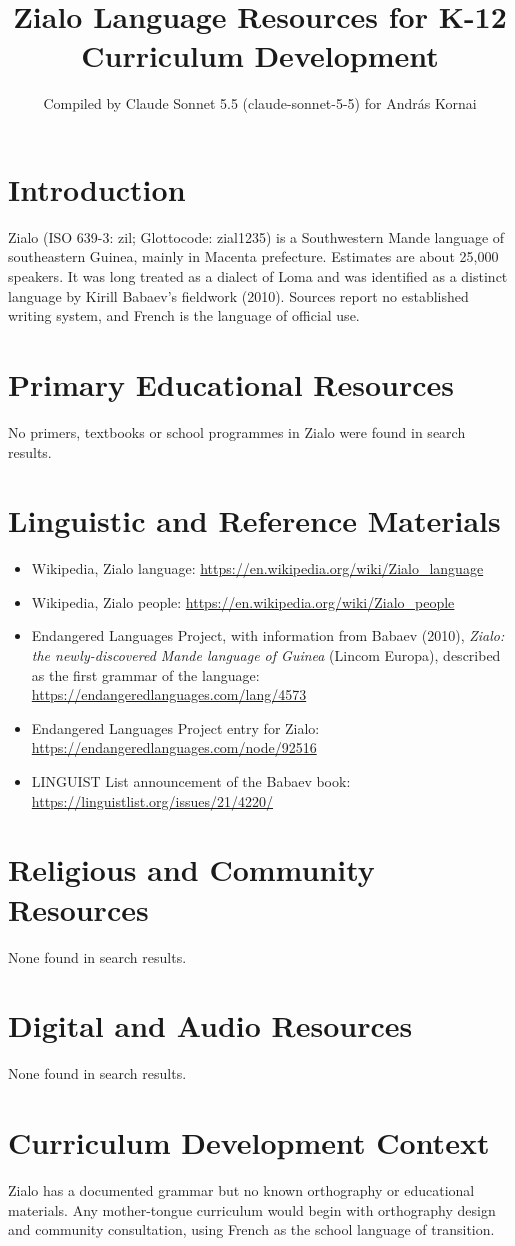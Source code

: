 \documentclass[12pt]{article}
\title{Zialo Language Resources for K-12 Curriculum Development}
\author{Compiled by Claude Sonnet 5.5 (claude-sonnet-5-5) for Andr\'as Kornai}
\date{}
\begin{document}
\maketitle

\section{Introduction}
Zialo (ISO 639-3: zil; Glottocode: zial1235) is a Southwestern Mande language of southeastern Guinea, mainly in Macenta prefecture. Estimates are about 25,000 speakers. It was long treated as a dialect of Loma and was identified as a distinct language by Kirill Babaev's fieldwork (2010). Sources report no established writing system, and French is the language of official use.

\section{Primary Educational Resources}
No primers, textbooks or school programmes in Zialo were found in search results.

\section{Linguistic and Reference Materials}
\begin{itemize}
\item Wikipedia, Zialo language: \url{https://en.wikipedia.org/wiki/Zialo_language}
\item Wikipedia, Zialo people: \url{https://en.wikipedia.org/wiki/Zialo_people}
\item Endangered Languages Project, with information from Babaev (2010), \emph{Zialo: the newly-discovered Mande language of Guinea} (Lincom Europa), described as the first grammar of the language: \url{https://endangeredlanguages.com/lang/4573}
\item Endangered Languages Project entry for Zialo: \url{https://endangeredlanguages.com/node/92516}
\item LINGUIST List announcement of the Babaev book: \url{https://linguistlist.org/issues/21/4220/}
\end{itemize}

\section{Religious and Community Resources}
None found in search results.

\section{Digital and Audio Resources}
None found in search results.

\section{Curriculum Development Context}
Zialo has a documented grammar but no known orthography or educational materials. Any mother-tongue curriculum would begin with orthography design and community consultation, using French as the school language of transition.
\end{document}
